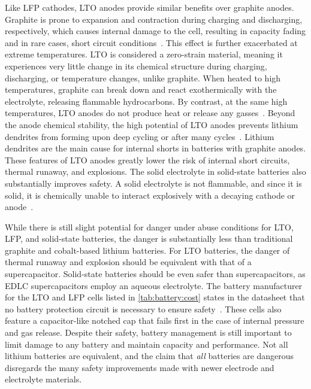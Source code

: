 Like LFP cathodes, LTO anodes provide similar benefits over graphite anodes. Graphite is prone to expansion and contraction during charging and discharging, respectively, which causes internal damage to the cell, resulting in capacity fading and in rare cases, short circuit conditions~\cite{sandhya2014lithium}. This effect is further exacerbated at extreme temperatures. 
LTO is considered a zero-strain material, meaning it experiences very little change in its chemical structure during charging, discharging, or temperature changes, unlike graphite. When heated to high temperatures, graphite can break down and react exothermically with the electrolyte, releasing flammable hydrocarbons. By contrast, at the same high temperatures, LTO anodes do not produce heat or release any gasses~\cite{belharouakElectrochemistry11}. Beyond the anode chemical stability, the high potential of LTO anodes prevents lithium dendrites from forming upon deep cycling or after many cycles~\cite{nitta2015li}. Lithium dendrites are the main cause for internal shorts in batteries with graphite anodes. These features of LTO anodes greatly lower the risk of internal short circuits, thermal runaway, and explosions.
The solid electrolyte in solid-state batteries also substantially improves safety. A solid electrolyte is not flammable, and since it is solid, it is chemically unable to interact explosively with a decaying cathode or anode~\cite{kim2015review}.

While there is still slight potential for danger under abuse conditions for LTO, LFP, and solid-state batteries, the danger is substantially less than traditional graphite and cobalt-based lithium batteries. For LTO batteries, the danger of thermal runaway and explosion should be equivalent with that of a supercapacitor. Solid-state batteries should be even safer than supercapacitors, as EDLC supercapacitors employ an aqueous electrolyte.
The battery manufacturer for the LTO and LFP cells listed in \cref{tab:battery:cost} states in the datasheet that no battery protection circuit is necessary to ensure safety~\cite{LTODatasheet,LTODatasheet2}. 
These cells also feature a capacitor-like notched cap that fails first in the case of internal pressure and gas release.
Despite their safety, battery management is still important to limit damage to any battery and maintain capacity and performance. 
Not all lithium batteries are equivalent, and the claim that \textit{all} batteries are dangerous disregards the many safety improvements made with newer electrode and electrolyte materials.

